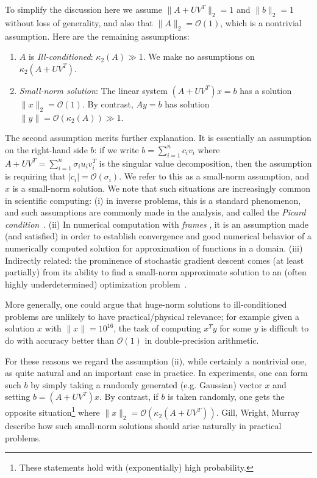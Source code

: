 \documentclass{siamltex}
\begin{document}
To simplify the discussion here we assume $\|A+UV^T\|_2=1$ and $\|b\|_2=1$ without loss of generality, and also that $\|A\|_2=\mathcal{O}(1)$, which is a nontrivial assumption. Here are the remaining assumptions: 
\begin{enumerate}
\item $A$ is \emph{Ill-conditioned}: $\kappa_2(A)\gg 1$. We make no assumptions on $\kappa_2(A+UV^T)$. 
\item \emph{Small-norm solution}: The linear system $(A+UV^T)x=b$ has a solution $\|x\|_2=\mathcal{O}(1)$. By contrast, $Ay=b$ has solution $\|y\| = \mathcal{O}(\kappa_2(A))\gg 1$. 
\end{enumerate}
The second assumption merits further explanation. 
It is essentially an assumption on the right-hand side $b$: if we write $b=\sum_{i=1}^nc_iv_i$ where $A+UV^T=\sum_{i=1}^n\sigma_iu_iv_i^T$ is the singular value decomposition, then the assumption is requiring that $|c_i| = \mathcal{O}(\sigma_i)$. We refer to this as a small-norm assumption, and $x$ is a small-norm solution. We note that such situations are increasingly common in scientific computing: (i) in inverse problems, this is a standard phenomenon, and such assumptions are commonly made in the analysis, and called the \emph{Picard condition}~\cite[\S 1.2.3]{hansen2010discrete}. 
(ii) In numerical computation with \emph{frames} \cite{adcock2019frames}, it is an assumption made (and satisfied) in order to establish convergence and good numerical behavior of a numerically computed solution for approximation of functions in a domain. 
(iii) Indirectly related: the prominence of stochastic gradient descent comes (at least partially) from its ability to find a small-norm approximate solution to an (often highly underdetermined) optimization problem~\cite{hastie2022surprises}. 

More generally, one could argue that huge-norm solutions to ill-conditioned problems are unlikely to have practical/physical relevance; for example given a solution $x$ with $\|x\|=10^{16}$, the task of computing $x^Ty$ for some $y$ is difficult to do with accuracy better than $\mathcal{O}(1)$ in double-precision arithmetic. 

For these reasons we regard the assumption (ii), while certainly a nontrivial one, as quite natural and an important case in practice. In experiments, one can form such $b$ by simply taking a randomly generated (e.g. Gaussian) vector $x$ and setting $b=(A+UV^T)x$. By contrast, if $b$ is taken randomly, one gets the opposite situation\footnote{These statements hold with (exponentially) high probability.} where $\|x\|_2=\mathcal{O}(\kappa_2(A+UV^T))$. Gill, Wright, Murray~\cite[p.~102]{gill2021numerical} describe how such small-norm solutions should arise naturally in practical problems. 
\end{document}
